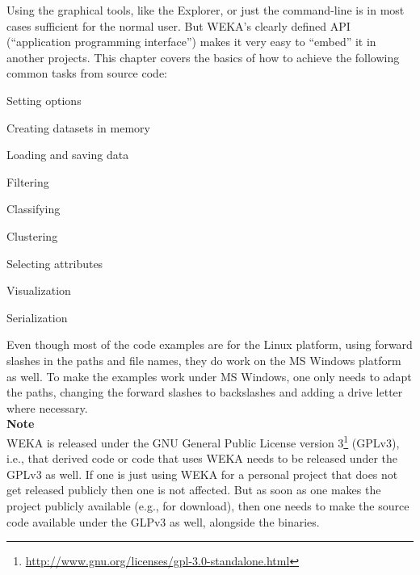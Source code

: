 %
%
%
%


Using the graphical tools, like the Explorer, or just the command-line is in
most cases sufficient for the normal user. But WEKA's clearly defined API
(``application programming interface'') makes it very easy to ``embed'' it in
another projects. This chapter covers the basics of how to achieve the
following common tasks from source code:
\begin{tight_itemize}
	\item Setting options
	\item Creating datasets in memory
	\item Loading and saving data
	\item Filtering
	\item Classifying
	\item Clustering
	\item Selecting attributes
	\item Visualization
	\item Serialization
\end{tight_itemize}
Even though most of the code examples are for the Linux platform, using forward
slashes in the paths and file names, they do work on the MS Windows platform as
well. To make the examples work under MS Windows, one only needs to adapt the
paths, changing the forward slashes to backslashes and adding a drive letter
where necessary. \\

\noindent \textbf{Note} \\
\noindent WEKA is released under the GNU General Public License version
3\footnote{\url{http://www.gnu.org/licenses/gpl-3.0-standalone.html}{}} (GPLv3), i.e., that
derived
code or code that uses WEKA needs to be released under the GPLv3 as well. If
one is just using WEKA for a personal project that does not get released
publicly then one is not affected. But as soon as one makes the project
publicly available (e.g., for download), then one needs to make the source code
available under the GLPv3 as well, alongside the binaries.

